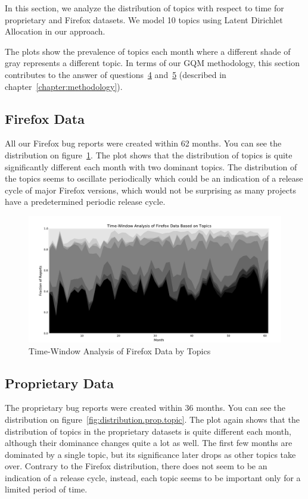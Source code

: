 In this section, we analyze the distribution of topics with respect to time for proprietary and Firefox datasets. We model 10 topics using Latent Dirichlet Allocation in our approach.

The plots show the prevalence of topics each month where a different shade of gray represents a different topic. In terms of our GQM methodology, this section contributes to the answer of questions~\hyperlink{question:4}{4} and~\hyperlink{question:5}{5} (described in chapter~\ref{chapter:methodology}).

\subsection{Firefox Data}

All our Firefox bug reports were created within 62 months. You can see the distribution on figure~\ref{fig:distribution.firefox.topic}. The plot shows that the distribution of topics is quite significantly different each month with two dominant topics. The distribution of the topics seems to oscillate periodically which could be an indication of a release cycle of major Firefox versions, which would not be surprising as many projects have a predetermined periodic release cycle. 

\begin{figure}[htbp]
    \centering
        \includegraphics[width=\textwidth]{./images/topic_component_distribution/firefox_topic_10.pdf}
    \caption{Time-Window Analysis of Firefox Data by Topics}
    \label{fig:distribution.firefox.topic}
\end{figure}

\subsection{Proprietary Data}

The proprietary bug reports were created within 36 months. You can see the distribution on figure~\ref{fig:distribution.prop.topic}. The plot again shows that the distribution of topics in the proprietary datasets is quite different each month, although their dominance changes quite a lot as well. The first few months are dominated by a single topic, but its significance later drops as other topics take over. Contrary to the Firefox distribution, there does not seem to be an indication of a release cycle, instead, each topic seems to be important only for a limited period of time.

